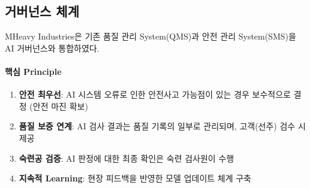 \subsection{거버넌스 체계}
\label{sec:7.4.2}

MHeavy Industries은 기존 품질 관리 System(QMS)과 안전 관리 System(SMS)을 
AI 거버넌스와 통합하였다.

\paragraph{핵심 Principle}

\begin{enumerate}
 \item \textbf{안전 최우선}: 
 AI 시스템 오류로 인한 안전사고 가능점이 있는 경우 
 보수적으로 결정 (안전 마진 확보)
 
 \item \textbf{품질 보증 연계}: 
 AI 검사 결과는 품질 기록의 일부로 관리되며, 
 고객(선주) 검수 시 제공
 
 \item \textbf{숙련공 검증}: 
 AI 판정에 대한 최종 확인은 숙련 검사원이 수행
 
 \item \textbf{지속적 Learning}: 
 현장 피드백을 반영한 모델 업데이트 체계 구축
\end{enumerate}

